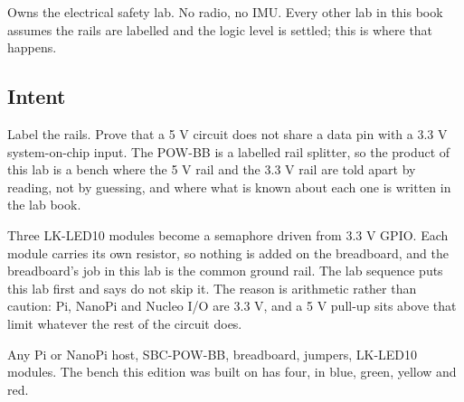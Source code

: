 
\begin{unique}
Owns the electrical safety lab. No radio, no IMU. Every other lab in this book assumes the rails are labelled and the logic level is settled; this is where that happens.
\end{unique}

\subsection*{Intent}

Label the rails. Prove that a 5 V circuit does not share a data pin with a 3.3 V system-on-chip input. The POW-BB is a labelled rail splitter, so the product of this lab is a bench where the 5 V rail and the 3.3 V rail are told apart by reading, not by guessing, and where what is known about each one is written in the lab book.

Three LK-LED10 modules become a semaphore driven from 3.3 V GPIO. Each module carries its own resistor, so nothing is added on the breadboard, and the breadboard's job in this lab is the common ground rail. The lab sequence puts this lab first and says do not skip it. The reason is arithmetic rather than caution: Pi, NanoPi and Nucleo I/O are 3.3 V, and a 5 V pull-up sits above that limit whatever the rest of the circuit does.

\begin{kit}
Any Pi or NanoPi host, SBC-POW-BB, breadboard, jumpers, LK-LED10 modules. The bench this edition was built on has four, in blue, green, yellow and red.
\end{kit}

